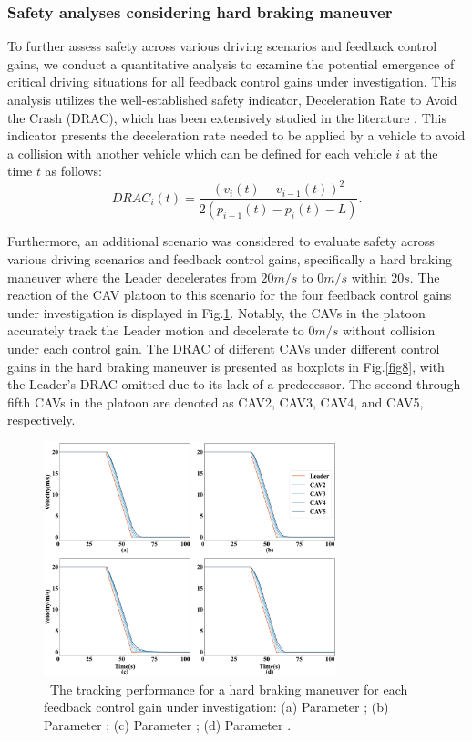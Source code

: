\documentclass[journal]{IEEEtran}
\begin{document}
\subsubsection{Safety analyses considering hard braking maneuver}
\label{Section 5.2.2}

To further assess safety across various driving scenarios and feedback control gains, we conduct a quantitative analysis to examine the potential emergence of critical driving situations for all feedback control gains under investigation. This analysis utilizes the well-established safety indicator, Deceleration Rate to Avoid the Crash (DRAC), which has been extensively studied in the literature \citep{fu2021comparison,fu2021random}. This indicator presents the deceleration rate needed to be applied by a vehicle to avoid a collision with another vehicle which can be defined for each vehicle $i$ at the time $t$ as follows:
\begin{equation}
  DRA{C_i}(t) = \frac{{{{\left( {{v_i}(t) - {v_{i - 1}}(t)} \right)}^2}}}{{2\left( {{p_{i - 1}}(t) - {p_i}(t) - L} \right)}}.
  \label{eq522}
\end{equation}


Furthermore, an additional scenario was considered to evaluate safety across various driving scenarios and feedback control gains, specifically a hard braking maneuver where the Leader decelerates from $20m/s$ to $0m/s$ within $20s$. The reaction of the CAV platoon to this scenario for the four feedback control gains under investigation is displayed in Fig.\ref{fig7}. Notably, the CAVs in the platoon accurately track the Leader motion and decelerate to $0m/s$ without collision under each control gain. The DRAC of different CAVs under different control gains in the hard braking maneuver is presented as boxplots in Fig.\ref{fig8}, with the Leader's DRAC omitted due to its lack of a predecessor. The second through fifth CAVs in the platoon are denoted as CAV2, CAV3, CAV4, and CAV5, respectively.



\begin{figure}

  \centering
  \includegraphics[width=8.5cm]{figs/fig7.png}
  \caption{~The tracking performance for a hard braking maneuver for each feedback control gain under investigation: (a) Parameter \uppercase\expandafter{}; (b) Parameter \uppercase\expandafter{}; (c) Parameter \uppercase\expandafter{}; (d) Parameter \uppercase\expandafter{}.}
  \label{fig7}
\end{figure}
\end{document}
